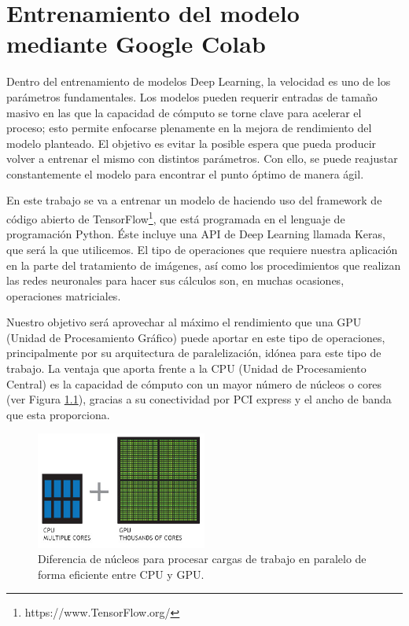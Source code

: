 \mbox{}


\chapter{Entrenamiento del modelo mediante Google Colab}
\label{ch:chapter2}
Dentro del entrenamiento de modelos Deep Learning, la velocidad es uno de los parámetros fundamentales.
Los modelos pueden requerir entradas de tamaño masivo en las que la capacidad de cómputo se torne clave para acelerar el proceso;
esto permite enfocarse plenamente en la mejora de rendimiento del modelo planteado.
El objetivo es evitar la posible espera que pueda producir volver a entrenar el mismo con distintos parámetros.
Con ello, se puede reajustar constantemente el modelo para encontrar el punto óptimo de manera ágil.

En este trabajo se va a entrenar un modelo de  haciendo uso del framework de código abierto de TensorFlow\footnote{https://www.TensorFlow.org/}, que está programada en el lenguaje de programación Python.
Éste incluye una API de Deep Learning llamada Keras, que será la que utilicemos.
El tipo de operaciones que requiere nuestra aplicación en la parte del tratamiento de imágenes, así como los procedimientos que realizan las redes neuronales para hacer sus cálculos son, en muchas ocasiones,
operaciones matriciales.

Nuestro objetivo será aprovechar al máximo el rendimiento que una GPU (Unidad de Procesamiento Gráfico) puede aportar en este tipo de operaciones, principalmente por su arquitectura de paralelización, idónea para este tipo de trabajo.
La ventaja que aporta frente a la CPU (Unidad de Procesamiento Central) es la capacidad de cómputo con un mayor número de núcleos o cores (ver Figura \ref{fig:Arquitectura de paralelización de una GPU}), gracias a su conectividad por PCI express y el ancho de banda que esta proporciona.

\begin{figure}
    \centering
    \includegraphics[width=0.5\textwidth]{images/chapter2/cpu-and-gpu.jpg}
    \caption{Diferencia de núcleos para procesar cargas de trabajo en paralelo de forma eficiente entre CPU y GPU.}
    \label{fig:Arquitectura de paralelización de una GPU}
\end{figure}


